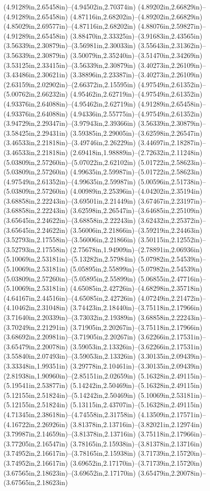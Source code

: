 (4.91289in,2.65458in)--(4.94502in,2.70374in) (4.89202in,2.66829in)--(4.91289in,2.65458in) (4.87116in,2.68202in)--(4.89202in,2.66829in) (4.85029in,2.69577in)--(4.87116in,2.68202in) (4.88076in,2.59827in)--(4.91289in,2.65458in) (3.88470in,2.33325in)--(3.91683in,2.43565in) (3.56339in,2.30879in)--(3.56981in,2.30033in) (3.55643in,2.31362in)--(3.56339in,2.30879in) (3.50079in,2.35240in)--(3.51470in,2.34269in) (3.53125in,2.33415in)--(3.56339in,2.30879in) (3.40273in,2.26109in)--(3.43486in,2.30621in) (3.38896in,2.23387in)--(3.40273in,2.26109in) (2.63159in,2.02902in)--(2.66372in,2.15595in) (4.97549in,2.61352in)--(5.00762in,2.66232in) (4.95462in,2.62719in)--(4.97549in,2.61352in) (4.93376in,2.64088in)--(4.95462in,2.62719in) (4.91289in,2.65458in)--(4.93376in,2.64088in) (4.94336in,2.55775in)--(4.97549in,2.61352in) (3.94729in,2.29347in)--(3.97943in,2.39366in) (3.56339in,2.30879in)--(3.58425in,2.29431in) (3.59385in,2.29005in)--(3.62598in,2.26547in) (3.46533in,2.21818in)--(3.49746in,2.26229in) (3.44697in,2.18287in)--(3.46533in,2.21818in) (2.69418in,1.98889in)--(2.72632in,2.11248in) (5.03809in,2.57260in)--(5.07022in,2.62102in) (5.01722in,2.58623in)--(5.03809in,2.57260in) (4.99635in,2.59987in)--(5.01722in,2.58623in) (4.97549in,2.61352in)--(4.99635in,2.59987in) (5.00596in,2.51738in)--(5.03809in,2.57260in) (4.00989in,2.25396in)--(4.04202in,2.35194in) (3.68858in,2.22243in)--(3.69501in,2.21449in) (3.67467in,2.23197in)--(3.68858in,2.22243in) (3.62598in,2.26547in)--(3.64685in,2.25109in) (3.65645in,2.24622in)--(3.68858in,2.22243in) (3.62432in,2.25372in)--(3.65645in,2.24622in) (3.56006in,2.21866in)--(3.59219in,2.24463in) (3.52793in,2.17558in)--(3.56006in,2.21866in) (3.50115in,2.12552in)--(3.52793in,2.17558in) (2.75678in,1.94909in)--(2.78891in,2.06936in) (5.10069in,2.53181in)--(5.13282in,2.57984in) (5.07982in,2.54539in)--(5.10069in,2.53181in) (5.05895in,2.55899in)--(5.07982in,2.54539in) (5.03809in,2.57260in)--(5.05895in,2.55899in) (5.06855in,2.47716in)--(5.10069in,2.53181in) (4.65085in,2.42726in)--(4.68298in,2.35718in) (4.64167in,2.44516in)--(4.65085in,2.42726in) (4.07249in,2.21472in)--(4.10462in,2.31048in) (3.74423in,2.18440in)--(3.75118in,2.17966in) (3.71640in,2.20339in)--(3.73032in,2.19389in) (3.68858in,2.22243in)--(3.70249in,2.21291in) (3.71905in,2.20267in)--(3.75118in,2.17966in) (3.68692in,2.20981in)--(3.71905in,2.20267in) (3.62266in,2.17531in)--(3.65479in,2.20078in) (3.59053in,2.13326in)--(3.62266in,2.17531in) (3.55840in,2.07493in)--(3.59053in,2.13326in) (3.30135in,2.09439in)--(3.33348in,1.99351in) (3.29778in,2.10461in)--(3.30135in,2.09439in) (2.81938in,1.90960in)--(2.85151in,2.02659in) (5.16328in,2.49115in)--(5.19541in,2.53877in) (5.14242in,2.50469in)--(5.16328in,2.49115in) (5.12155in,2.51824in)--(5.14242in,2.50469in) (5.10069in,2.53181in)--(5.12155in,2.51824in) (5.13115in,2.43707in)--(5.16328in,2.49115in) (4.71345in,2.38618in)--(4.74558in,2.31758in) (4.13509in,2.17571in)--(4.16722in,2.26926in) (3.81378in,2.13716in)--(3.82021in,2.12974in) (3.79987in,2.14659in)--(3.81378in,2.13716in) (3.75118in,2.17966in)--(3.77205in,2.16547in) (3.78165in,2.15938in)--(3.81378in,2.13716in) (3.74952in,2.16617in)--(3.78165in,2.15938in) (3.71739in,2.15720in)--(3.74952in,2.16617in) (3.69652in,2.17170in)--(3.71739in,2.15720in) (3.67565in,2.18623in)--(3.69652in,2.17170in) (3.65479in,2.20078in)--(3.67565in,2.18623in) 